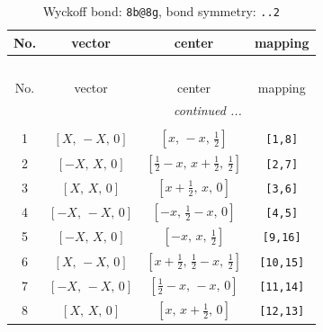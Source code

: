 \documentclass[fleqn,8pt]{jsarticle}
\begin{document}
\renewcommand{\arraystretch}{1.2}
\begin{longtable}{cccc}
\caption{Wyckoff bond: {\tt 8b@8g}, bond symmetry: {\tt ..2}}
 \\
 \hline \hline
No. & vector & center & mapping \\ \hline \endfirsthead

\multicolumn{3}{l}{\tablename\ \thetable{}} \\
 \hline \hline
No. & vector & center & mapping \\ \hline \endhead

 \hline \hline
\multicolumn{3}{r}{\footnotesize\it continued ...} \\ \endfoot

 \hline \hline
\multicolumn{3}{r}{} \\ \endlastfoot

1 & $\left[ X,\, - X,\, 0 \right]$ & $\left[ x,\, - x,\, \frac{1}{2} \right]$ & {\tt [1,8]} \\ \hline
2 & $\left[ - X,\, X,\, 0 \right]$ & $\left[ \frac{1}{2} - x,\, x + \frac{1}{2},\, \frac{1}{2} \right]$ & {\tt [2,7]} \\ \hline
3 & $\left[ X,\, X,\, 0 \right]$ & $\left[ x + \frac{1}{2},\, x,\, 0 \right]$ & {\tt [3,6]} \\ \hline
4 & $\left[ - X,\, - X,\, 0 \right]$ & $\left[ - x,\, \frac{1}{2} - x,\, 0 \right]$ & {\tt [4,5]} \\ \hline
5 & $\left[ - X,\, X,\, 0 \right]$ & $\left[ - x,\, x,\, \frac{1}{2} \right]$ & {\tt [9,16]} \\ \hline
6 & $\left[ X,\, - X,\, 0 \right]$ & $\left[ x + \frac{1}{2},\, \frac{1}{2} - x,\, \frac{1}{2} \right]$ & {\tt [10,15]} \\ \hline
7 & $\left[ - X,\, - X,\, 0 \right]$ & $\left[ \frac{1}{2} - x,\, - x,\, 0 \right]$ & {\tt [11,14]} \\ \hline
8 & $\left[ X,\, X,\, 0 \right]$ & $\left[ x,\, x + \frac{1}{2},\, 0 \right]$ & {\tt [12,13]} \\
\end{longtable}
\renewcommand{\arraystretch}{1.2}
\end{document}
